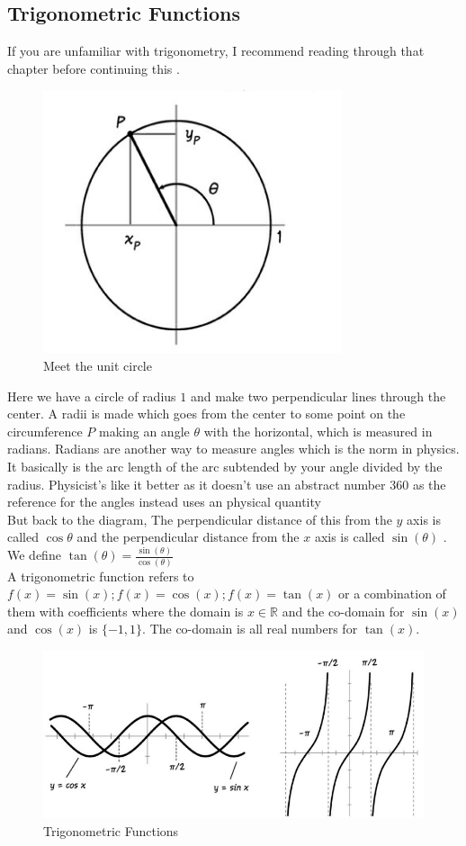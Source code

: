 \subsection{Trigonometric Functions}
If you are unfamiliar with trigonometry, I recommend reading through that chapter before continuing this .\\
\begin{figure} [h]
    \centering
    \includegraphics[width=0.5\linewidth]{Photos/Trigonometric circle.png}
    \caption{Meet the unit circle}
    
\end{figure}
Here we have a circle of radius $1$ and make two perpendicular lines through the center. A radii is made which goes from the center to some point on the circumference $P$ making an angle $\theta$  with the horizontal, which is measured in radians. Radians are another way to measure angles which is the norm in physics. It basically is the arc length of the arc subtended by your angle divided by the radius.  Physicist's like it better as it doesn't use an abstract number 360 as the reference for the angles instead uses an physical quantity\\
But back to the diagram, The perpendicular distance of this from the $y$ axis is called $\cos\theta$ and the perpendicular distance from the $x$ axis is called $\sin(\theta)$ . We define $\tan(\theta) =\frac{\sin(\theta)}{\cos(\theta)}$\\
A trigonometric function refers to $f(x)=\sin(x);f(x)=\cos(x); f(x)=\tan(x)$ or  a combination of them with coefficients  where the domain is $x \in \mathbb{R}$ and the co-domain for $\sin(x)$ and $\cos(x)$ is $\{-1,1\}$. The co-domain is all real numbers for $\tan(x)$. \\
\begin{figure} [h]
    \centering
    \includegraphics[width=0.5\linewidth]{Photos/Trigonometric functions.png}
    \caption{Trigonometric Functions}
    
\end{figure}
